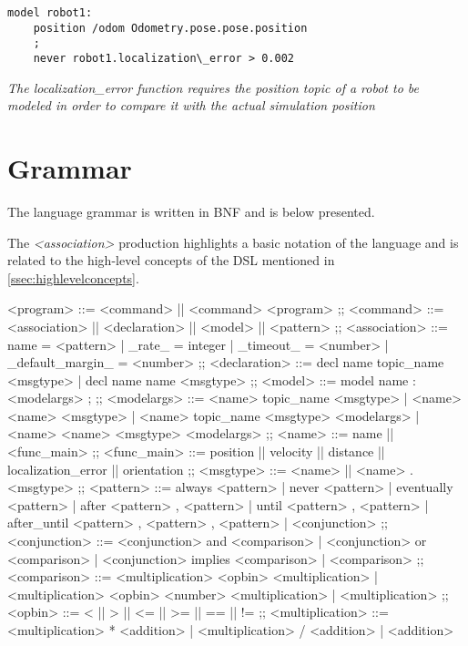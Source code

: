 \begin{lstlisting}
model robot1:
    position /odom Odometry.pose.pose.position
    ;
    never robot1.localization\_error > 0.002
\end{lstlisting}

\textit{The localization\_error function requires the position topic of a robot to be modeled in order to compare it with the actual simulation position}

\section{Grammar}
\label{sec:grammar}

The language grammar is written in BNF and is below presented.

The \textit{<association>} production highlights a basic notation of the language and is related to the high-level concepts of the DSL mentioned in \autoref{ssec:highlevelconcepts}.

\begin{bnfgrammar}
    <program> %
    ::=
    <command> || <command> <program>
    ;;
    <command> ::=
    <association>
    || <declaration>
    || <model>
    || <pattern>
    ;; 
    <association> ::=
    name = <pattern>
    | \_rate\_ = integer
    | \_timeout\_ = <number>
    | \_default\_margin\_ = <number>
    ;;
    <declaration> ::=
    decl name topic\_name <msgtype>
    | decl name name <msgtype>
    ;;
    <model> ::= 
    model name $\colon$ <modelargs> ;
    ;;
    <modelargs> ::= 
    <name> topic\_name <msgtype>
    | <name> <name> <msgtype>
    | <name> topic\_name <msgtype> <modelargs>
    | <name> <name> <msgtype> <modelargs>
    ;;
    <name> ::= 
    name || <func\_main>
    ;;
    <func\_main> ::= 
    position
    || velocity
    || distance
    || localization\_error
    || orientation
    ;;
    <msgtype> ::= 
    <name> || <name> . <msgtype>
    ;;
    <pattern> ::= 
    always <pattern>
    | never <pattern>
    | eventually <pattern>
    | after <pattern> , <pattern>
    | until <pattern> , <pattern>
    | after\_until <pattern> , <pattern> , <pattern>
    | <conjunction>
    ;;
    <conjunction> ::= 
    <conjunction> and <comparison>
    | <conjunction> or <comparison>
    | <conjunction> implies <comparison>
    | <comparison>
    ;;
    <comparison> ::= 
    <multiplication> <opbin> <multiplication>
    | <multiplication> <opbin> { <number> } <multiplication>
    | <multiplication>
    ;;
    <opbin> ::= 
    < || > || <= || >= || == || !=
    ;;
    <multiplication> ::= 
    <multiplication> * <addition>
    | <multiplication> / <addition>
    | <addition>
\end{bnfgrammar}

